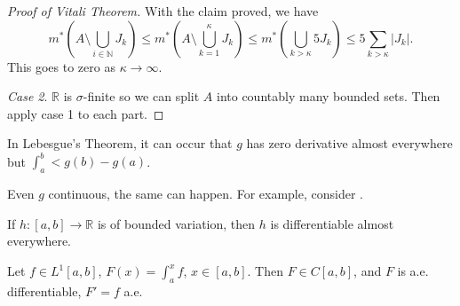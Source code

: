 \begin{proof}[Proof of Vitali Theorem]
	With the claim proved, we have
	\[
		m^*\left( A \setminus  \bigcup_{i \in \mathbb{N}}  J_k\right) \le  m^* \left( A\setminus \bigcup_{k = 1}^\kappa J_k  \right) 
		\le m^*\left( \bigcup_{k > \kappa} 5 J_k \right) \le 5 \sum_{k > \kappa} |J_k|
	.\] 
	This goes to zero as $\kappa \to \infty $.

	\textit{Case 2}. $\mathbb{R}$ is $\sigma$-finite so we can split $A$ into countably many bounded sets. Then apply  case 1 to each part.
\end{proof}

\begin{remark}
	In Lebesgue's Theorem, it can occur that $g$ has zero derivative almost everywhere but $\int _a^b < g(b) - g(a)$.

	Even $g$ continuous, the same can happen. For example, consider .
\end{remark}

\begin{corollary}
	If $h: [a,b] \to \mathbb{R}$ is of bounded variation, then $h$ is differentiable almost everywhere.
\end{corollary}

\begin{theorem}
	Let $f \in L^1[a,b]$, $F(x) = \int _a^x f$, $x \in [a,b]$. Then $F \in C[a,b]$, and $F$ is a.e. differentiable, $F' = f$ a.e.
\end{theorem}
